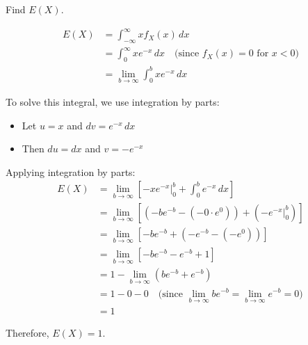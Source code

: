 \documentclass{article}
\begin{document}
    Find $E(X)$.

    \begin{align*}
        E(X) &= \int_{-\infty}^{\infty} x f_X(x) \, dx \\
             &= \int_{0}^{\infty} x e^{-x} \, dx \quad \text{(since $f_X(x) = 0$ for $x < 0$)} \\
             &= \lim_{b \to \infty} \int_{0}^{b} x e^{-x} \, dx
    \end{align*}

    To solve this integral, we use integration by parts:
    \begin{itemize}
        \item Let $u = x$ and $dv = e^{-x} \, dx$
        \item Then $du = dx$ and $v = -e^{-x}$
    \end{itemize}

    Applying integration by parts:
    \begin{align*}
        E(X) &= \lim_{b \to \infty} \left[ -x e^{-x} \bigg|_{0}^{b} + \int_{0}^{b} e^{-x} \, dx \right] \\
             &= \lim_{b \to \infty} \left[ (-b e^{-b} - (-0 \cdot e^{0})) + \left( -e^{-x} \bigg|_{0}^{b} \right) \right] \\
             &= \lim_{b \to \infty} \left[ -b e^{-b} + \left( -e^{-b} - (-e^{0}) \right) \right] \\
             &= \lim_{b \to \infty} \left[ -b e^{-b} - e^{-b} + 1 \right] \\
             &= 1 - \lim_{b \to \infty} (b e^{-b} + e^{-b}) \\
             &= 1 - 0 - 0 \quad \text{(since $\lim_{b \to \infty} b e^{-b} = \lim_{b \to \infty} e^{-b} = 0$)} \\
             &= 1
    \end{align*}

    Therefore, $E(X) = 1$.


            
            
            
\end{document}
